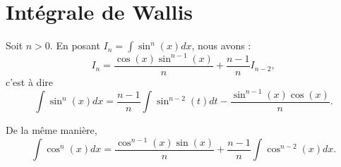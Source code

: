 \section{Intégrale de Wallis}

\begin{lemma}     \label{LEMooMGUVooIIQSmC}
    Soit \( n>0\). En posant \( I_n=\int\sin^n(x)dx\), nous avons :
    \begin{equation}
        I_n=\frac{ \cos(x)\sin^{n-1}(x) }{ n }+\frac{ n-1 }{ n }I_{n-2},
    \end{equation}
    c'est à dire
    \begin{equation}
        \int\sin^n(x)dx=\frac{ n-1 }{ n }\int\sin^{n-2}(t)dt-\frac{ \sin^{n-1}(x)\cos(x) }{ n }.
    \end{equation}

    De la même manière,
    \begin{equation}        \label{EQooWJMIooSgBbJx}
        \int\cos^n(x)dx=\frac{ \cos^{n-1}(x)\sin(x) }{ n }+\frac{ n-1 }{ n }\int\cos^{n-2}(x)dx.
    \end{equation}
\end{lemma}

